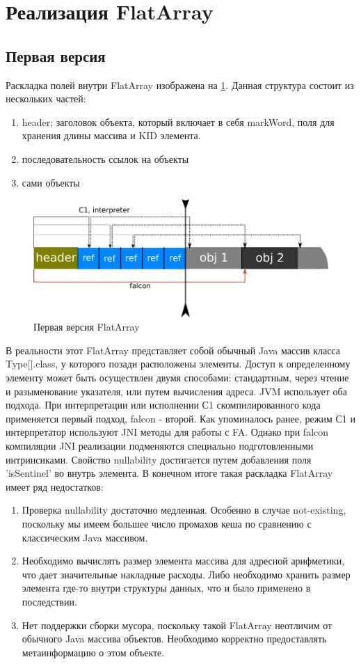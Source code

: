 \section{Реализация FlatArray}
\subsection{Первая версия}
Раскладка полей внутри FlatArray изображена на \ref{first-fa}.
Данная структура состоит из нескольких частей:
\begin{enumerate}
	\item header; заголовок объекта, который включает в себя markWord, поля для хранения длины массива и KID элемента.
	\item последовательность ссылок на объекты
	\item сами объекты
\end{enumerate}
\begin{figure}[h]
	\caption{Первая версия FlatArray}\label{first-fa}
	\includegraphics[width=0.95\linewidth]{image/flatarray.png}
\end{figure}
В реальности этот FlatArray представляет собой обычный Java массив класса Type[].class, у которого позади расположены элементы. Доступ к определенному элементу может быть осуществлен двумя способами: стандартным, через чтение и разыменование указателя, или путем вычисления адреса. 
JVM использует оба подхода. При интерпретации или исполнении С1 скомпилированного кода применяется первый подход, falcon - второй. 
Как упоминалось ранее, режим С1 и интерпретатор используют JNI методы для работы с FA. Однако при falcon компиляции JNI реализации подменяются специально подготовленными интринсиками. 
Свойство nullability достигается путем добавления поля 'isSentinel' во внутрь элемента. 
В конечном итоге такая раскладка FlatArray имеет ряд недостатков:
\begin{enumerate}
	\item Проверка nullability достаточно медленная. Особенно в случае not-existing, поскольку мы имеем большее число промахов кеша по сравнению с классическим Java массивом.
	\item Необходимо вычислять размер элемента массива для адресной арифметики, что дает значительные накладные расходы. Либо необходимо хранить размер элемента где-то внутри структуры данных, что и было применено в последствии.
	\item Нет поддержки сборки мусора, поскольку такой FlatArray неотличим от обычного Java массива объектов. 
	Необходимо корректно предоставлять метаинформацию о этом объекте. 
\end{enumerate}
